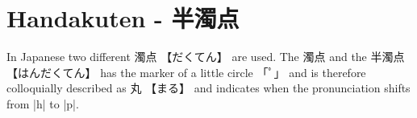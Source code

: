 \section{Handakuten - 半濁点} \label{sec:Handakuten}

In Japanese two different {濁点} {【だくてん】} are used. The {濁点}  and  the
{半濁点} {【はんだくてん】} has the marker of a little circle {「ﾟ」} and is
therefore colloquially described as {丸} {【まる】} and indicates when the
pronunciation shifts from |h| to |p|.

